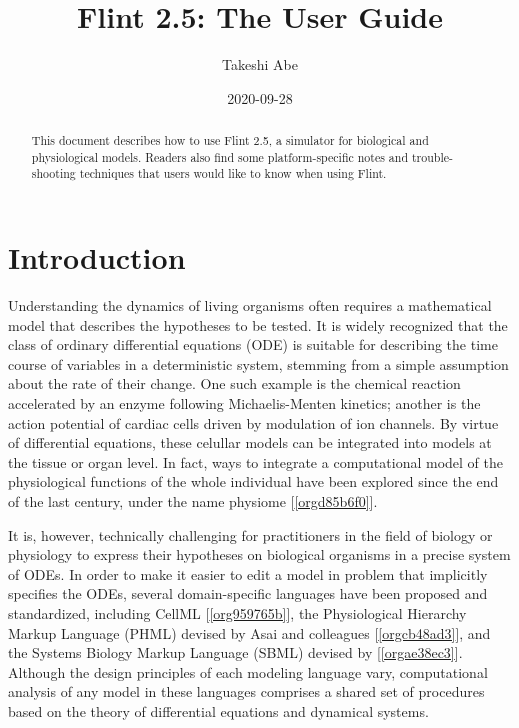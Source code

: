 \documentclass[a4paper,10pt]{report}
\author{Takeshi Abe}
\date{2020-09-28}
\title{Flint 2.5: The User Guide}
\begin{document}
\maketitle
\tableofcontents

\vfill

\doclicenseThis

\begin{abstract}
This document describes how to use Flint 2.5, a simulator for biological and physiological models.
Readers also find some platform-specific notes and trouble-shooting techniques that
users would like to know when using Flint.
\end{abstract}

\chapter{Introduction}
\label{sec:orgfd543b7}

Understanding the dynamics of living organisms often requires a mathematical model
that describes the hypotheses to be tested. It is widely recognized that the
class of ordinary differential equations (ODE) is suitable for describing the
time course of variables in a deterministic system, stemming from a simple
assumption about the rate of their change.
One such example is the chemical reaction accelerated by an enzyme
following Michaelis-Menten kinetics; another is the action potential of
cardiac cells driven by modulation of ion channels. By virtue of
differential equations, these celullar models can be integrated into models at the
tissue or organ level. In fact, ways to integrate a computational model of
the physiological functions of the whole individual have been explored since the
end of the last century, under the name physiome [\ref{orgd85b6f0}].

It is, however, technically challenging for practitioners in the field of
biology or physiology to express their hypotheses on biological organisms in a
precise system of ODEs. In order to make it easier to edit a model in problem
that implicitly specifies the ODEs, several domain-specific languages have
been proposed and standardized, including CellML [\ref{org959765b}], the
Physiological Hierarchy Markup Language (PHML) devised by Asai and colleagues
[\ref{orgcb48ad3}], and the Systems Biology Markup Language (SBML) devised
by [\ref{orgae38ec3}]. Although the design principles of each modeling
language vary, computational analysis of any model in these languages
comprises a shared set of procedures based on the theory of differential
equations and dynamical systems.
\end{document}
